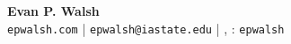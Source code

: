 \documentclass{res} %
\begin{document}

\begin{center}
{\bf\large Evan P. Walsh} \\
\vspace{1mm}
\hspace{3mm}\texttt{epwalsh.com} | \texttt{epwalsh@iastate.edu} | \faLinkedin, \faGithub: \texttt{epwalsh}\\
\end{center}
\vspace{-5mm}
\address{
{\bf Department of Statistics} \\
Iowa State University \\ 
2410 Snedecor Hall \\
Ames, IA 50011 \\
} 
\end{document}

